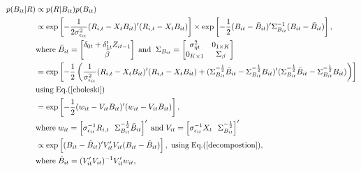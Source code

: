 \begin{alignat}{2}
p(B_{it}|R) &\propto p(R|B_{it})p(B_{it})  \nonumber  \\ 
 &\propto  \text{exp}\left[-\frac{1}{2\sigma^2_{\epsilon_{it}}}(R_{i,t}-X_tB_{it})'(R_{i,t}-X_tB_{it})\right] \times \text{exp}\left[-\frac{1}{2}(B_{it}-\bar{B}_{it})'\Sigma^{-1}_{B_{it}}(B_{it}-\bar{B}_{it})\right],  \nonumber  \\ & \text{where} \hspace{0.1cm} \bar{B}_{it} = \begin{bmatrix} \delta_{0t} + \delta'_{1t}Z_{it-1} \\ \bar{\beta} \end{bmatrix} \hspace{0.1cm} \text{and} \hspace{0.2cm} \Sigma_{B_{it}} = \begin{bmatrix} \sigma^2_{\eta t} & 0_{1\times K} \\ 0_{K \times 1} & \Sigma_{\beta} \end{bmatrix} \nonumber  \\ 
      &= \text{exp}\left[-\frac{1}{2}\left( \frac{1}{\sigma^2_{\epsilon_{it}}} (R_{i,t}-X_tB_{it})'(R_{i,t}-X_tB_{it}) + (\Sigma^{-\frac{1}{2}}_{B_{it}}\bar{B}_{it} - \Sigma^{-\frac{1}{2}}_{B_{it}}B_{it})'(\Sigma^{-\frac{1}{2}}_{B_{it}}\bar{B}_{it} - \Sigma^{-\frac{1}{2}}_{B_{it}}B_{it})\right)\right] \nonumber  \\ 
& \text{using} \hspace{0.1cm} \text{Eq.(\ref{choleski})} \nonumber  \\ 
  &= \text{exp} \left[-\frac{1}{2}(w_{it}-V_{it}B_{it})'(w_{it}-V_{it}B_{it})\right], \nonumber \\ 
  & \text{where} \hspace{0.1cm} w_{it} = \left[\sigma^{-1}_{\epsilon_{it}}R_{i,t} \hspace{0.25cm} \Sigma^{-\frac{1}{2}}_{B_{it}} \bar{B}_{it} \right]' \hspace{0.1cm} \text{and} \hspace{0.1cm} V_{it} =  \left[\sigma^{-1}_{\epsilon_{it}} X_t \hspace{0.25cm} \Sigma^{-\frac{1}{2}}_{B_{it}} \right]' \nonumber \\ 
  &\propto  \text{exp}\left[(B_{it} - \hat{B}_{it})'V_{it}'V_{it}(B_{it} - \hat{B}_{it})\right], \hspace{0.1cm} \text{using} \hspace{0.1cm} \text{Eq.}(\text{\ref{decompostion}}), \nonumber \\ 
  & \text{where} \hspace{0.1cm} \hat{B}_{it} = (V_{it}'V_{it})^{-1}V_{it}'w_{it},
\end{alignat}  
